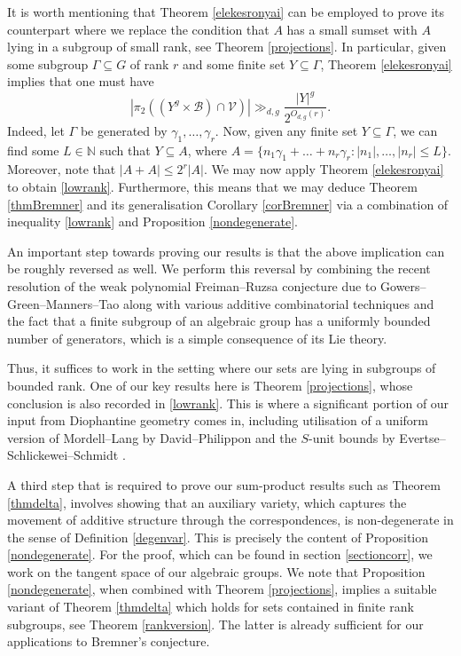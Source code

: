 \documentclass[12pt, reqno]{amsart}
\theoremstyle{remark}
\theoremstyle{definition}
\numberwithin{equation}{section}
\begin{document}
It is worth mentioning that Theorem \ref{elekesronyai} can be employed to prove its counterpart where we replace the condition that $A$ has a small sumset with $A$ lying in a subgroup of small rank, see Theorem \ref{projections}. In particular, given some subgroup $\Gamma \subseteq G$ of rank $r$ and some finite set $Y \subseteq \Gamma$, Theorem \ref{elekesronyai} implies that one must have
\begin{equation} \label{lowrank}   
|\pi_2((Y^g\times \mathcal{B}) \cap \mathcal{V})| \gg_{d,g} \frac{|Y|^g}{2^{O_{d,g}(r)}}. 
\end{equation}
Indeed, let $\Gamma$ be generated by $\gamma_1, \dots, \gamma_r$. Now, given any finite set $Y \subseteq \Gamma$, we can find some $L \in \mathbb{N}$ such that $Y \subseteq A$, where $A = \{ n_1 \gamma_1 + \dots + n_r \gamma_r : |n_1|, \dots, |n_r| \leq L\}$. Moreover, note that $|A+A| \leq 2^r |A|$. We may now apply Theorem \ref{elekesronyai} to obtain \eqref{lowrank}. Furthermore, this means that we may deduce Theorem \ref{thmBremner} and its generalisation Corollary \ref{corBremner} via a combination of inequality \eqref{lowrank}  and Proposition \ref{nondegenerate}.

An important step towards proving our results is that the above implication can be roughly reversed as well. We perform this reversal by combining the recent resolution of the weak polynomial Freiman--Ruzsa conjecture due to Gowers--Green--Manners--Tao \cite{GGMT2025} along with various additive combinatorial techniques and the fact that a finite subgroup of an algebraic group has a uniformly bounded number of generators, which is a simple consequence of its Lie theory.  

Thus, it suffices to work in the setting where our sets are lying in subgroups of bounded rank. One of our key results here is Theorem \ref{projections}, whose conclusion is also recorded in  \eqref{lowrank}. This is where a significant portion of our input from Diophantine geometry comes in, including utilisation of a uniform version of Mordell--Lang by David--Philippon \cite{DavidPhilippon} and the $S$-unit bounds by Evertse--Schlickewei--Schmidt \cite{ESSlinear}. 

A third step that is required to prove our sum-product results such as Theorem \ref{thmdelta}, involves showing that an auxiliary variety, which captures the movement of additive structure through the correspondences, is non-degenerate in the sense of Definition \ref{degenvar}. This is precisely the content of Proposition \ref{nondegenerate}. For the proof, which can be found in section \ref{sectioncorr}, we work on the tangent space of our algebraic groups. We note that Proposition \ref{nondegenerate}, when combined with Theorem \ref{projections}, implies a suitable variant of Theorem \ref{thmdelta} which holds for sets contained in finite rank subgroups, see Theorem \ref{rankversion}. The latter is already sufficient for our applications to Bremner's conjecture.
\end{document}
